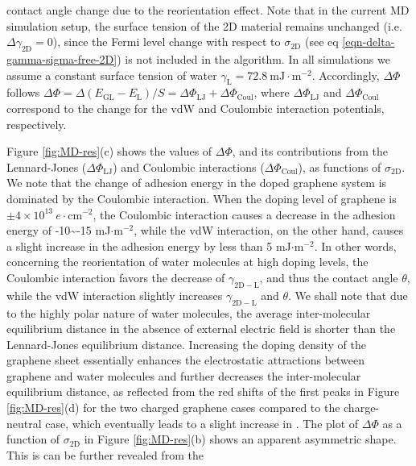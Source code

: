 \documentclass[journal=jacsat,manuscript=article,email=true]{achemso}
\begin{document}
contact angle change due to the reorientation effect. Note that in the
current MD simulation setup, the surface tension of the 2D material
remains unchanged (i.e. \(\Delta \gamma_{\mathrm{2D}}=0\)), since the
Fermi level change with
respect to \(\sigma_{\mathrm{2D}}\) (see eq
\ref{eqn-delta-gamma-sigma-free-2D}) is not included in the algorithm. In all simulations we assume a
constant surface tension of water \(\gamma_{\mathrm{L}}=72.8\
\mathrm{mJ}\cdot \mathrm{m}^{-2}\). Accordingly, \(\Delta \Phi\) follows
\(\Delta \Phi = \Delta (E_{\mathrm{GL}} - E_{\mathrm{L}})/S = \Delta
\Phi_{\mathrm{LJ}} + \Delta \Phi_{\mathrm{Coul}}\), where \(\Delta
\Phi_{\mathrm{LJ}}\) and \(\Delta \Phi_{\mathrm{Coul}}\) correspond to
the change for the vdW and Coulombic interaction potentials,
respectively.


Figure \ref{fig:MD-res}(c) shows the values of \(\Delta \Phi\), and its
contributions from the Lennard-Jones (\(\Delta \Phi_{\mathrm{LJ}}\)) and
Coulombic interactions (\(\Delta \Phi_{\mathrm{Coul}}\)), as functions
of \(\sigma_{\mathrm{2D}}\). We note that the change of adhesion energy
in the doped graphene system is dominated by the Coulombic
interaction. When the doping level of graphene is \(\pm 4 \times
10^{13}\ e\cdot \mathrm{cm}^{-2}\), the Coulombic interaction causes a
decrease in the adhesion energy of -10\textasciitilde{}-15 mJ\(\cdot \mathrm{m}^{-2}\),
while the vdW interaction, on the other hand, causes a slight increase
in the adhesion energy by less than 5 mJ\(\cdot \mathrm{m}^{-2}\). In
other words, concerning the reorientation of water molecules at high
doping levels, the Coulombic interaction favors the decrease of
\(\gamma_{\mathrm{2D-L}}\), and thus the contact angle \(\theta\), while
the vdW interaction slightly increases \(\gamma_{\mathrm{2D-L}}\) and
\(\theta\). We shall note that due to the highly polar nature of water
molecules, the average inter-molecular equilibrium distance in the
absence of external electric field is shorter than the Lennard-Jones
equilibrium distance. Increasing the doping density of the graphene
sheet essentially enhances the electrostatic attractions between
graphene and water molecules and further decreases the inter-molecular
equilibrium distance, as reflected from the red shifts of the first
peaks in Figure \ref{fig:MD-res}(d) for the two charged graphene cases
compared to the charge-neutral case, which eventually leads to a
slight increase in .  The plot of \(\Delta \Phi\) as a function of
\(\sigma_{\mathrm{2D}}\) in Figure \ref{fig:MD-res}(b) shows an apparent
asymmetric shape. This is can be further revealed from the
\end{document}
